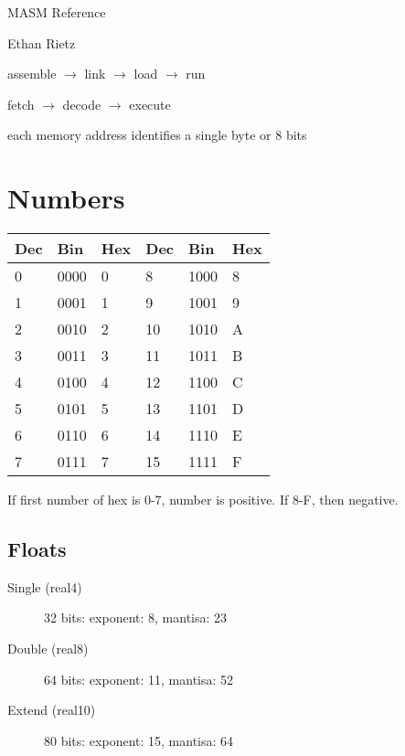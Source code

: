 \documentclass[10pt,landscape]{article}
\begin{document}
\begin{center}
  MASM Reference

  Ethan Rietz
\end{center}

\begin{multicols*}{3}

assemble $\rightarrow$ link $\rightarrow$ load $\rightarrow$ run

fetch $\rightarrow$ decode $\rightarrow$ execute

each memory address identifies a single byte or 8 bits

\section{Numbers}

\begin{tabular}{|llllll|} \hline

  Dec & Bin  & Hex & Dec & Bin  & Hex \\ \hline
  0   & 0000 & 0   & 8   & 1000 & 8   \\
  1   & 0001 & 1   & 9   & 1001 & 9   \\
  2   & 0010 & 2   & 10  & 1010 & A   \\
  3   & 0011 & 3   & 11  & 1011 & B   \\
  4   & 0100 & 4   & 12  & 1100 & C   \\
  5   & 0101 & 5   & 13  & 1101 & D   \\
  6   & 0110 & 6   & 14  & 1110 & E   \\
  7   & 0111 & 7   & 15  & 1111 & F   \\ \hline

\end{tabular}

If first number of hex is 0-7, number is positive. If 8-F, then negative.

\subsection{Floats}

\begin{description}
  \item[Single (real4)] 32 bits: exponent: 8, mantisa: 23
  \item[Double (real8)] 64 bits: exponent: 11, mantisa: 52
  \item[Extend (real10)] 80 bits: exponent: 15, mantisa: 64
\end{description}


\end{multicols*}
\end{document}
